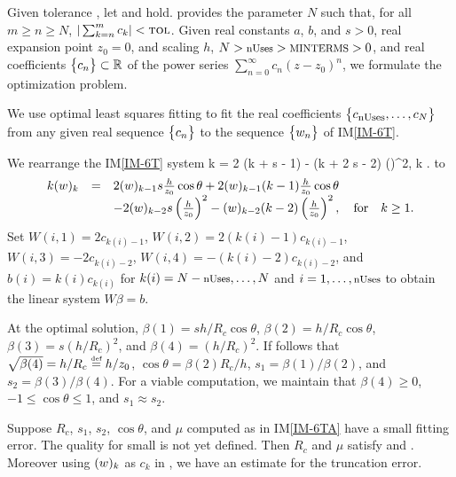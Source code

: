\documentclass[12pt]{article}
\newcommand{\iref}[1]{IM\ref{#1}}
\begin{document}
Given tolerance \tol,
let  and  hold.  provides the parameter $N$ such that, for all
$m \geq n \geq N$, $| \sum_{k=n}^{m} c_k | < \text{\sc tol}$.
Given real constants $a$, $b$, and $s>0$, real expansion point $z_0 = 0$, and scaling $h$,
$N > \text{\footnotesize nUses} > \text{\footnotesize MINTERMS} > 0$, and real coefficients $\bigl\{ {c_n} \bigr\} \subset \mathbb{R}$
of the power series $\sum_{n=0}^{\infty} c_n (z-z_0)^n$, we formulate the optimization problem.

We use optimal least squares fitting to fit the real
coefficients $\bigl\{ {c_{\text{\footnotesize nUses}}, \ldots, c_N } \bigr\}$ from any given real sequence $\bigl\{ {c_n} \bigr\}$
to the sequence $\bigl\{ {w_n} \bigr\}$ of \iref{IM-6T}.

We rearrange the \iref{IM-6T} system
\EQ
{
  \label{eq:6TA}
      k  = 2  (k +   s - 1)  \cos \theta
                    - (k + 2 s - 2) \left(\right)^2,
                   \quad {} \quad k .
}
to
\begin{equation}
  \begin{array}{rcl}
    k (w)_{k} & = & 2 (w)_{k-1} s \frac{h}{z_0} \cos \theta
                     +2 (w)_{k-1} (k - 1) \frac{h}{z_0} \cos \theta\\
                &   &-2 (w)_{k-2} s \left( \frac{h}{z_0} \right)^2
                     -  (w)_{k-2} (k - 2) \left( \frac{h}{z_0} \right)^2,
  \quad \text{for} \quad k \geq 1.
  \end{array}
\end{equation}
Set
$W(i, 1) = 2 c_{k(i)-1}$,
$W(i, 2) = 2 (k(i)- 1) c_{k(i)-1}$,
$W(i, 3) =-2 c_{k(i)-2}$,
$W(i, 4) =-(k(i)- 2) c_{k(i)-2}$,
and
$b(i) = k(i) c_{k(i)}$ for $k(i)=N-\text{\footnotesize nUses}, \ldots, N$ and $i=1, \ldots, \text{\footnotesize nUses}$
to obtain the linear system $W \beta = b$.

At the optimal solution,
$\beta(1) = s h/R_c \cos \theta$,
$\beta(2) = h/R_c \cos \theta$,
$\beta(3) = s (h/R_c)^2$, and
$\beta(4) = (h/R_c)^2$.
If follows that
$\sqrt{\beta(4)} = h/R_c \stackrel{\textup{\tiny def}}{=} h/z_0$,
$\cos \theta = \beta(2) R_c/h$,
$s_1 = \beta(1)/\beta(2)$, and
$s_2 = \beta(3)/\beta(4)$.
For a viable computation, we maintain that 
$\beta(4) \geq 0$,
$-1 \leq \cos \theta \leq 1$, and $s_1 \approx s_2$.

Suppose $R_c$, $s_1$, $s_2$, $\cos \theta$, and $\mu$ computed as in \iref{IM-6TA}
have a small fitting error. The quality for small is not yet defined. Then $R_c$ and $\mu$ satisfy
 and . Moreover using
$(w)_{k}$ as $c_k$ in , we have an estimate for the truncation error.
\end{document}
